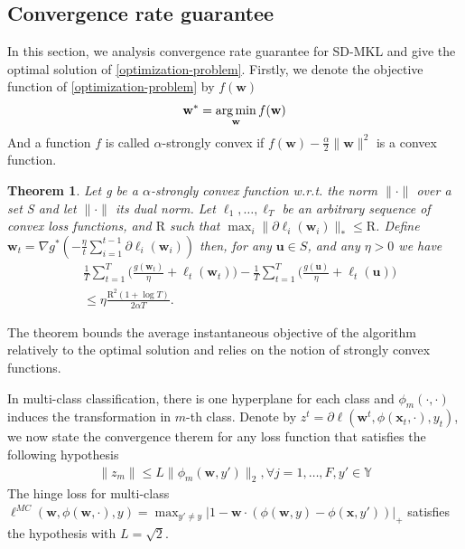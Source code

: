 \documentclass{article}
\newcommand{\argmin}{\operatornamewithlimits{arg\,min}}
\newtheorem{theorem}{Theorem}
\begin{document}
\subsection{Convergence rate guarantee}
In this section, we analysis convergence rate guarantee for SD-MKL and give the optimal solution of \eqref{optimization-problem}. Firstly, we denote the objective function of \eqref{optimization-problem} by $f(\mathbf{w})$
\begin{align*}
    \mathbf{w}^\ast=\argmin_{\mathbf{w}} f(\mathbf{w})
\end{align*}
And a function $f$ is called $\alpha$-strongly convex if $f(\mathbf{w})-\frac{\alpha}{2}\|\mathbf{w}\|^2$ is a convex function.
\begin{theorem} \cite{Shalev-ShwartzSS07}
\label{convergence_rate}
Let g be a $\alpha$-strongly convex function w.r.t. the norm $\|\cdot\|$ over a set S and let $\|\cdot\|$ its dual norm. Let $\ell_1, \ldots, \ell_T$ be an arbitrary sequence of convex loss functions, and $\mathrm{R}$ such that $\max_i\|\partial\ell_i(\mathbf{w}_i)\|_\ast \leq \mathrm{R}$. Define $\mathbf{w}_t=\nabla g^\ast(-\frac{\eta}{t}\sum_{i=1}^{t-1}\partial\ell_i(\mathbf{w}_i))$ then, for any $\mathbf{u} \in S$, and any $\eta > 0$ we have
\begin{align*}
    &\frac{1}{T}\sum_{t=1}^T\Big(\frac{g(\mathbf{w}_t)}{\eta}+\ell_t(\mathbf{w}_t)\Big)
    -\frac{1}{T}\sum_{t=1}^T\Big(\frac{g(\mathbf{u})}{\eta}+\ell_t(\mathbf{u})\Big)\\
    &\leq \eta\frac{\mathrm{R}^2(1+\log T)}{2\alpha T}.
\end{align*}
\end{theorem}
The theorem bounds the average instantaneous objective of the algorithm relatively to the optimal solution and relies on the notion of strongly convex functions.

In multi-class classification, there is one hyperplane for each class and $\phi_m(\cdot, \cdot)$ induces the transformation in $m$-th class. Denote by $z^t=\partial\ell(\mathbf{w}^t,\phi(\mathbf{x}_t,\cdot), y_t)$, we now state the convergence therem for any loss function that satisfies the following hypothesis
\begin{align}
\label{loss_function_hypothesis}
    \|z_m\| \leq L\|\phi_m(\mathbf{w}, y')\|_2, \forall j =1,\ldots, F, y' \in \mathbb{Y}
\end{align}
The hinge loss for multi-class $\ell^{MC}(\mathbf{w}, \phi(\mathbf{w},\cdot), y) = \max_{y' \not =y} |1-\mathbf{w}\cdot(\phi(\mathbf{w},y)-\phi(\mathbf{x},y'))|_+$ satisfies the hypothesis with $L=\sqrt{2}$.
\end{document}
